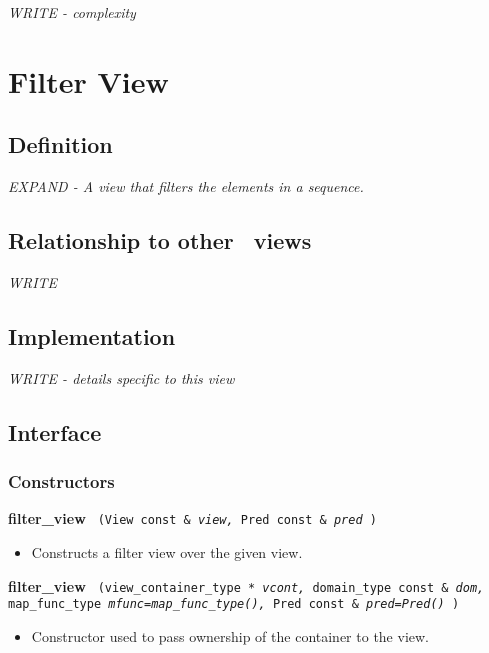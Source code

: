 \emph{WRITE - complexity}


\section{Filter View} \label{sec-filt-vw}

\subsection{Definition}

\textit{EXPAND - A view that filters the elements in a sequence.}

\subsection{Relationship to other \stapl\ views}

\textit{WRITE}

\subsection{Implementation}

\textit{WRITE - details specific to this view}

\subsection{Interface} \label{sec-filt-vw-inter}

\subsubsection{Constructors}

\noindent
\textbf{filter\_view}%
\texttt{%
(View const \&
\textit{view,}%
Pred const \&
\textit{pred}%
)
}

\begin{itemize}
\item
Constructs a filter view over the given view.
\end{itemize}

\noindent
\textbf{filter\_view}%
\texttt{%
(view\_container\_type *
\textit{vcont,}%
domain\_type const \&
\textit{dom,}%
map\_func\_type
\textit{mfunc=map\_func\_type(),}%
Pred const \&
\textit{pred=Pred()}%
)
}

\begin{itemize}
\item
Constructor used to pass ownership of the container to the view.
\end{itemize}

